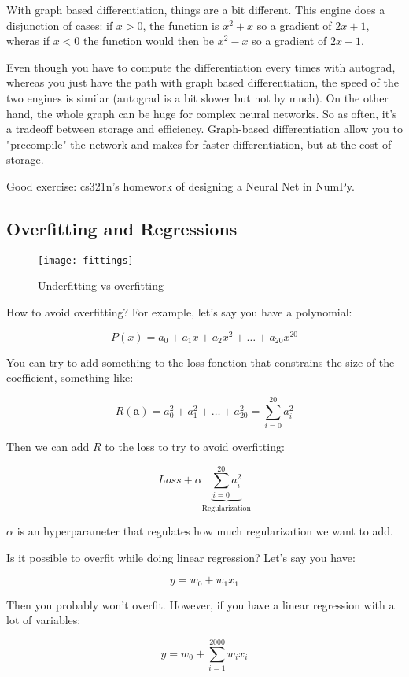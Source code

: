 \documentclass{article}
\theoremstyle{problemstyle}
\begin{document}
With graph based differentiation, things are a bit different. This engine does a disjunction of cases: if $x > 0$, the function is $x^2 + x$ so a gradient of $2x + 1$, wheras if $x< 0 $ the function would then be $x^2 - x$ so a gradient of $2x - 1$.

Even though you have to compute the differentiation every times with autograd, whereas you just have the path with graph based differentiation, the speed of the two engines is similar (autograd is a bit slower but not by much). On the other hand, the whole graph can be huge for complex neural networks. So as often, it's a tradeoff between storage and efficiency. Graph-based differentiation allow you to "precompile" the network and makes for faster differentiation, but at the cost of storage. 

Good exercise: cs321n's homework of designing a Neural Net in NumPy. 

\subsection{Overfitting and Regressions}

\begin{figure}[h]
  \texttt{[image: fittings]}
  \caption{Underfitting vs overfitting}
\end{figure}

How to avoid overfitting? For example, let's say you have a polynomial:

\[
  P(x) = a_0 + a_1x + a_2 x^2+ \dots + a_{20}x^{20}
\]

You can try to add something to the loss fonction that constrains the size of the coefficient, something like:

\[
  R(\textbf{a}) = a_0^2 + a_1^2 + \dots + a_{20} ^2 = \sum\limits_{i=0}^{20} a_i ^ 2
\]

Then we can add $R$ to the loss to try to avoid overfitting:

\[
  Loss + \alpha \underbrace{\sum\limits_{i=0}^{20} a_i ^ 2}_{\text{Regularization} }
\]

$\alpha$ is an hyperparameter that regulates how much regularization we want to add.

Is it possible to overfit while doing linear regression? Let's say you have:

\[
  y = w_0 + w_1 x_1
\]

Then you probably won't overfit. However, if you have a linear regression with a lot of variables:

\[
  y = w_0 + \sum\limits_{i=1}^{2000} w_i x_i
\]
\end{document}

